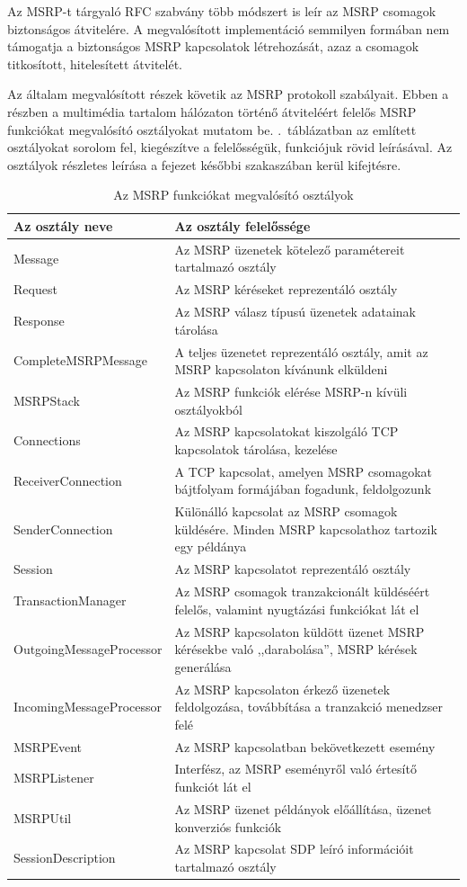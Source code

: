 Az MSRP-t tárgyaló RFC szabvány több módszert is leír az MSRP csomagok biztonságos átvitelére. A megvalósított implementáció semmilyen formában nem támogatja a biztonságos MSRP kapcsolatok létrehozását, azaz a csomagok titkosított, hitelesített átvitelét. 

Az általam megvalósított részek követik az MSRP protokoll szabályait\cite{rfc4975}. Ebben a részben a multimédia tartalom hálózaton történő átviteléért felelős MSRP funkciókat megvalósító osztályokat mutatom be.  .~táblázatban az említett osztályokat sorolom fel, kiegészítve a felelősségük, funkciójuk rövid leírásával. Az osztályok részletes leírása a fejezet későbbi szakaszában kerül kifejtésre.

\begin{table}[htb]
\center
\begin{tabular}{|l | p{9.5cm} |}
\hline
{\bf Az osztály neve} & {\bf Az osztály felelőssége}\\
\hline
\hline
Message & Az MSRP üzenetek kötelező paramétereit tartalmazó osztály\\ \hline
Request & Az MSRP kéréseket reprezentáló osztály\\ \hline
Response & Az MSRP válasz típusú üzenetek adatainak tárolása\\ \hline
CompleteMSRPMessage & A teljes üzenetet reprezentáló osztály, amit az MSRP kapcsolaton kívánunk elküldeni\\ \hline
MSRPStack & Az MSRP funkciók elérése MSRP-n kívüli osztályokból\\ \hline
Connections & Az MSRP kapcsolatokat kiszolgáló TCP kapcsolatok tárolása, kezelése\\ \hline
ReceiverConnection & A TCP kapcsolat, amelyen MSRP csomagokat bájtfolyam formájában fogadunk, feldolgozunk\\ \hline
SenderConnection & Különálló kapcsolat az MSRP csomagok küldésére. Minden MSRP kapcsolathoz tartozik egy példánya\\ \hline
Session & Az MSRP kapcsolatot reprezentáló osztály\\ \hline
TransactionManager & Az MSRP csomagok tranzakcionált küldéséért felelős, valamint nyugtázási funkciókat lát el\\ \hline
OutgoingMessageProcessor & Az MSRP kapcsolaton küldött üzenet MSRP kérésekbe való ,,darabolása'', MSRP kérések generálása\\ \hline
IncomingMessageProcessor & Az MSRP kapcsolaton érkező üzenetek feldolgozása, továbbítása a tranzakció menedzser felé\\ \hline
MSRPEvent & Az MSRP kapcsolatban bekövetkezett esemény\\ \hline
MSRPListener & Interfész, az MSRP eseményről való értesítő funkciót lát el\\ \hline
MSRPUtil & Az MSRP üzenet példányok előállítása, üzenet konverziós funkciók\\ \hline
SessionDescription & Az MSRP kapcsolat SDP leíró információit tartalmazó osztály\\ \hline
\end{tabular}
\caption{Az MSRP funkciókat megvalósító osztályok}
\label{tab:msrp_classes}
\end{table}

